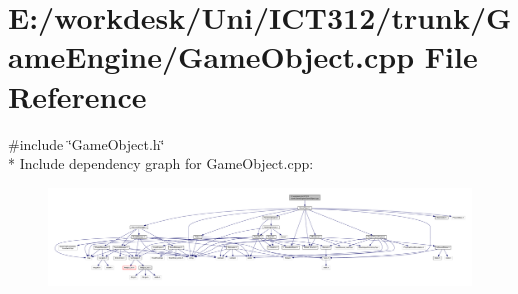 \section{E\+:/workdesk/\+Uni/\+I\+C\+T312/trunk/\+Game\+Engine/\+Game\+Object.cpp File Reference}
\label{_game_object_8cpp}
{\ttfamily \#include \char`\"{}Game\+Object.\+h\char`\"{}}\\*
Include dependency graph for Game\+Object.\+cpp\+:\nopagebreak
\begin{figure}[H]
\begin{center}
\leavevmode
\includegraphics[width=350pt]{d3/d56/_game_object_8cpp__incl}
\end{center}
\end{figure}
